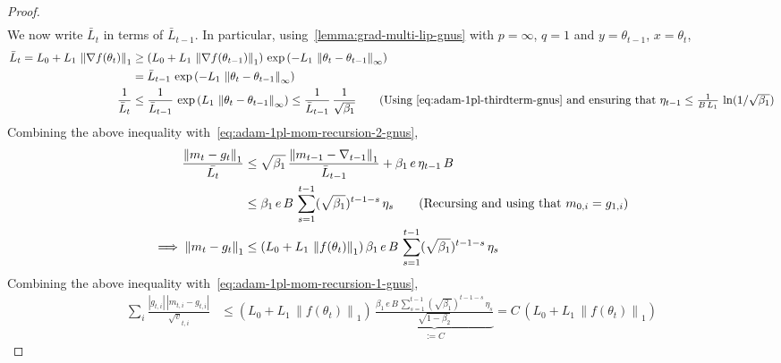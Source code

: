 \documentclass{article}
\newcommand{\ti}[1]{#1_{t,i}}
\newcommand{\norm}[1]{\left\|#1 \right\|}
\newcommand{\tht}{\theta_t}
\begin{document}
\begin{proof}
\begin{align}
\end{align}
We now write $\bar{L}_t$ in terms of $\bar{L}_{t-1}$. In particular, using~\cref{lemma:grad-multi-lip-gnus} with $p = \infty$, $q = 1$ and $y = \theta_{t-1}$, $x = \tht$, 
\begin{align}
\bar{L}_t = L_0 + L_1 \, \norm{\nabla f(\tht)}_1 & \geq \left(L_0 + L_1 \, \norm{\nabla f(\theta_{t-1})}_1 \right) \, \exp\left(-L_1 \, \norm{\tht - \theta_{t-1}}_{\infty} \right)\nonumber\\
& = \bar{L}_{t-1} \, \exp\left(-L_1 \, \norm{\tht - \theta_{t-1}}_{\infty} \right) \nonumber\\
\frac{1}{\bar{L}_t} & \leq \frac{1}{\bar{L}_{t-1}} \, \exp\left(L_1 \, \norm{\tht - \theta_{t-1}}_{\infty} \right) \leq \frac{1}{\bar{L}_{t-1}} \, \frac{1}{\sqrt{\beta_1}} \tag{Using~\cref{eq:adam-1pl-thirdterm-gnus} and ensuring that $\eta_{t-1} \leq \frac{1}{B \, L_1} \, \ln(1/\sqrt{\beta_1}$}
\end{align}
Combining the above inequality with~\cref{eq:adam-1pl-mom-recursion-2-gnus}, 
\begin{align}
\frac{\norm{m_t - g_t}_1}{\bar{L_t}} & \leq \sqrt{\beta_1} \, \frac{\norm{m_{t-1}  - \nabla_{t-1}}_{1}}{\bar{L}_{t-1}} + \beta_1\,e \, \eta_{t-1} \, B \\
& \leq \beta_1\,e \, B \, \sum_{s = 1}^{t-1} (\sqrt{\beta_1})^{t-1-s} \, \eta_{s} \tag{Recursing and using that $m_{0,i} = g_{1,i}$} \\
\implies \norm{m_t - g_t}_1 & \leq (L_0 + L_1 \, \norm{f(\tht)}_1) \,\beta_1\, e \, B \, \sum_{s = 1}^{t-1} (\sqrt{\beta_1})^{t-1-s} \, \eta_{s} \label{eq:adam-1pl-mom-recursion-final-gnus}
\end{align}
Combining the above inequality with~\cref{eq:adam-1pl-mom-recursion-1-gnus}, 
\begin{align*}
\sum_i \frac{|\ti{g}| \, |\ti{m} - \ti{g}|}{\ti{\sqrt{v}}}  & \leq (L_0 + L_1 \, \norm{f(\tht)}_1) \, \underbrace{\frac{\beta_1\,e \, B \, \sum_{s = 1}^{t-1} (\sqrt{\beta_1})^{t-1-s} \, \eta_{s}}{\sqrt{1 - \beta_2}}}_{:= C} = C \, (L_0 + L_1 \, \norm{f(\tht)}_1)
\end{align*}
    
\end{proof}
\end{document}
